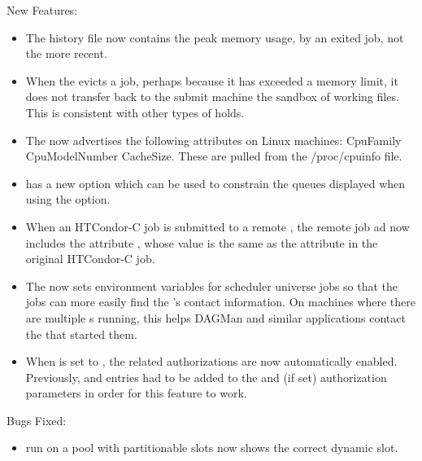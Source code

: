 \noindent New Features:

\begin{itemize}

\item The  history file now contains the peak
memory usage, by an exited job, not the more recent.

\item When the  evicts a job, perhaps because
it has exceeded a memory limit, it does not transfer back to
the submit machine the sandbox of working files.  This is
consistent with other types of holds.

\item The  now advertises the following attributes
on Linux machines: CpuFamily CpuModelNumber CacheSize.  These are
pulled from the /proc/cpuinfo file.

\item {} has a new option  which can be used
to constrain the queues displayed when using the  option.

\item When an HTCondor-C job is submitted to a remote ,
the remote job ad now includes the attribute ,
whose value is the same as the attribute  in the
original HTCondor-C job.

\item The  now sets environment variables for scheduler
universe jobs so that the jobs can more easily find the 's
contact information.
On machines where there are multiple s running, this helps
DAGMan and similar applications contact the  that started
them.

\item When  is set
to , the related authorizations are now automatically enabled.
Previously,  and
 entries had to be added to the
 and  (if set)
authorization parameters in order for this feature to work.

\end{itemize}

\noindent Bugs Fixed:

\begin{itemize}

\item 

 \-run on a pool with partitionable slots now shows
the correct dynamic slot.

\end{itemize}

